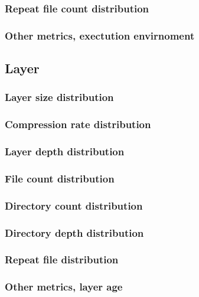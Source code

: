 \subsubsection{Repeat file count distribution}

\subsubsection{Other metrics, exectution envirnoment}

\subsection{Layer}

\subsubsection{Layer size distribution}

\subsubsection{Compression rate distribution}

\subsubsection{Layer depth distribution}

\subsubsection{File count distribution}

\subsubsection{Directory count distribution}

\subsubsection{Directory depth distribution}

\subsubsection{Repeat file distribution}

\subsubsection{Other metrics, layer age}

